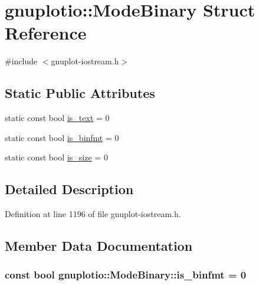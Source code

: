 \hypertarget{structgnuplotio_1_1_mode_binary}{}\section{gnuplotio\+:\+:Mode\+Binary Struct Reference}
\label{structgnuplotio_1_1_mode_binary}


{\ttfamily \#include $<$gnuplot-\/iostream.\+h$>$}

\subsection*{Static Public Attributes}
\begin{DoxyCompactItemize}
\item 
static const bool \hyperlink{structgnuplotio_1_1_mode_binary_ac89064b5df24f7ef4d765fdfde4fd1b6}{is\+\_\+text} = 0
\item 
static const bool \hyperlink{structgnuplotio_1_1_mode_binary_aee724034dc3372b8e12b1187507bf136}{is\+\_\+binfmt} = 0
\item 
static const bool \hyperlink{structgnuplotio_1_1_mode_binary_a6eae25ea662362bbb88bc987d6025290}{is\+\_\+size} = 0
\end{DoxyCompactItemize}


\subsection{Detailed Description}


Definition at line 1196 of file gnuplot-\/iostream.\+h.



\subsection{Member Data Documentation}
\subsubsection[{\texorpdfstring{is\+\_\+binfmt}{is_binfmt}}]{\setlength{\rightskip}{0pt plus 5cm}const bool gnuplotio\+::\+Mode\+Binary\+::is\+\_\+binfmt = 0\hspace{0.3cm}{\ttfamily [static]}}\hypertarget{structgnuplotio_1_1_mode_binary_aee724034dc3372b8e12b1187507bf136}{}\label{structgnuplotio_1_1_mode_binary_aee724034dc3372b8e12b1187507bf136}


